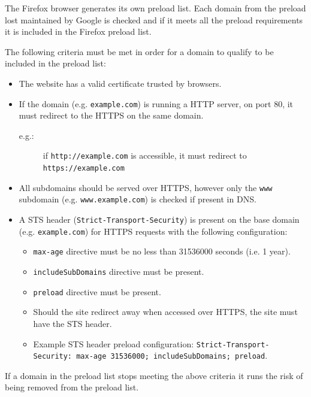 \documentclass{mscreport}
\begin{document}
\vspace{0.3cm} \noindent
The Firefox browser generates its own preload list. Each domain from the preload lost maintained by Google is checked and if it meets all the preload requirements it is included in the Firefox preload list.

\vspace{0.3cm} \noindent
The following criteria must be met in order for a domain to qualify to be included in the preload list:

\begin{itemize}
  \setlength\itemsep{0.1em}
  \item The website has a valid certificate trusted by browsers.
  \item If the domain (e.g. \texttt{example.com}) is running a HTTP server, on port 80, it must redirect to the HTTPS on the same domain.
  \begin{description}
  \item[e.g.:] if \texttt{http://example.com} is accessible, it must redirect to \texttt{https://example.com}
  \end{description}
  \item All subdomains should be served over HTTPS, however only the \texttt{www} subdomain (e.g. \texttt{www.example.com}) is checked if present in DNS.
  \item A STS header (\texttt{Strict-Transport-Security}) is present on the base domain (e.g. \texttt{example.com}) for HTTPS requests with the following configuration:
  \begin{itemize}
    \item \texttt{max-age} directive must be no less than 31536000 seconds (i.e. 1 year).
    \item \texttt{includeSubDomains} directive must be present.
    \item \texttt{preload} directive must be present.
    \item Should the site redirect away when accessed over HTTPS, the site must have the STS header.
    \item Example STS header preload configuration: \texttt{Strict-Transport-Security: max-age 31536000; includeSubDomains; preload}.
  \end{itemize} 
\end{itemize}

\vspace{0.3cm} \noindent
If a domain in the preload list stops meeting the above criteria it runs the risk of being removed from the preload list.
\end{document}
